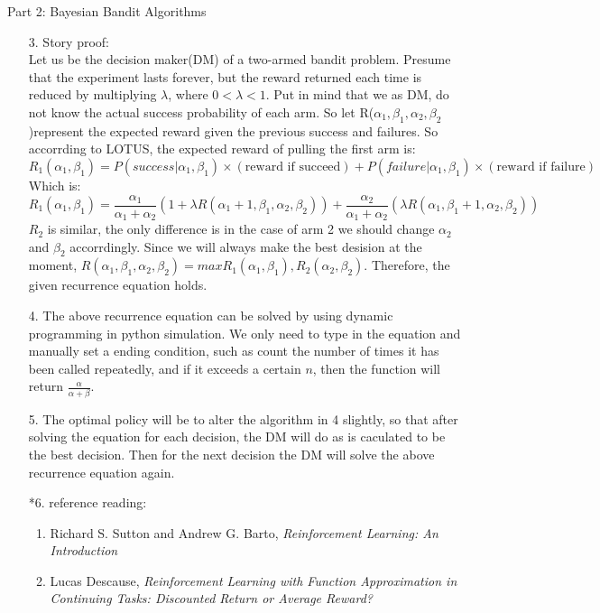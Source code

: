 \documentclass{article}
\begin{document}
\begin{homeworkProblem}{Part 2: Bayesian Bandit Algorithms}
\begin{enumerate}
        \item[3.]
        Story proof:\\
        Let us be the decision maker(DM) of a two-armed bandit problem. Presume that the experiment lasts forever, 
        but the reward returned each time is reduced by multiplying $\lambda$, where $0<\lambda<1$. Put in mind that we as DM, 
        do not know the actual success probability of each arm. So let R($\alpha_1,\beta_1,\alpha_2,\beta_2$)represent the expected reward given the previous success and failures.
        So accorrding to LOTUS, the expected reward of pulling the first arm is:
        $$R_1(\alpha_1,\beta_1) = P(success|\alpha_1,\beta_1)\times(\text{reward if succeed})+P(failure|\alpha_1,\beta_1)\times(\text{reward if failure})$$
        Which is:
        $$R_1(\alpha_1,\beta_1) = \frac{\alpha_1}{\alpha_1+\alpha_2}(1+\lambda R(\alpha_1+1,\beta_1,\alpha_2,\beta_2))+\frac{\alpha_2}{\alpha_1+\alpha_2}(\lambda R(\alpha_1,\beta_1+1,\alpha_2,\beta_2))$$
        $R_2$ is similar, the only difference is in the case of arm 2 we should change $\alpha_2$ and $\beta_2$ accorrdingly.
        Since we will always make the best desision at the moment, $R(\alpha_1,\beta_1,\alpha_2,\beta_2) = max{R_1(\alpha_1,\beta_1),R_2(\alpha_2,\beta_2)}$.
        Therefore, the given recurrence equation holds.
        \item[4.]
        The above recurrence equation can be solved by using dynamic programming in python simulation. We only need to type in the equation and manually set a ending condition,
        such as count the number of times it has been called repeatedly, and if it exceeds a certain $n$, then the function will return $\frac{\alpha}{\alpha+\beta}$.
        \item[5.]
        The optimal policy will be to alter the algorithm in 4 slightly, so that after solving the equation for each decision, the DM will do as is caculated to be the best decision.
        Then for the next decision the DM will solve the above recurrence equation again.
        \item[*6.] reference reading:
        \begin{enumerate}[1]
            \item Richard S. Sutton and Andrew G. Barto, \textsl{Reinforcement Learning: An Introduction}
            \item Lucas Descause, \textsl{Reinforcement Learning with Function Approximation in Continuing Tasks: Discounted Return or Average Reward?}
        \end{enumerate}
    \end{enumerate}
\end{homeworkProblem}
\end{document}
